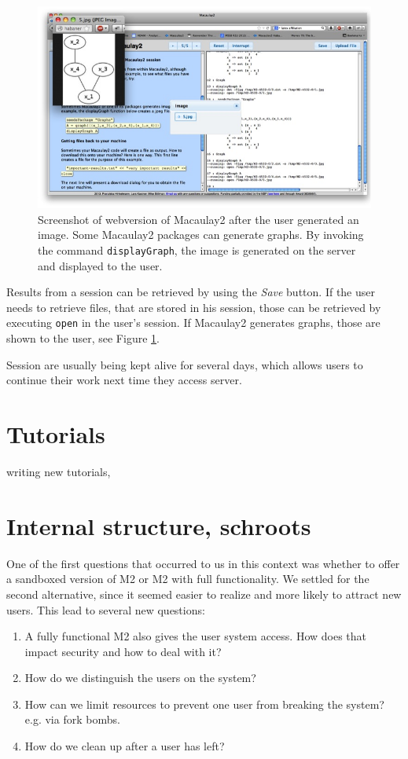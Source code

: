 \documentclass[]{article}
\begin{document}
\begin{figure}[htb]
    \includegraphics[width=.95\textwidth]{withGraph.jpg}
    \caption{Screenshot of webversion of Macaulay2 after the user generated an image. Some Macaulay2 packages can generate graphs. By invoking the command {\tt displayGraph}, the image is generated on the server and displayed to the user.}
    \label{fig:graph}
\end{figure}

Results from a session can be retrieved by using the {\it Save} button. If the user needs to retrieve files, that are stored in his session, those can be retrieved by executing {\tt open} in the user's session. If Macaulay2 generates graphs, those are shown to the user, see Figure \ref{fig:graph}.

Session are usually being kept alive for several days, which allows users to continue their work next time they access server. 

\section{Tutorials}
writing new tutorials,
\section{Internal structure, schroots}
One of the first questions that occurred to us in this context was whether to offer a sandboxed version of M2 or M2 with full functionality.
We settled for the second alternative, since it seemed easier to realize and more likely to attract new users.
This lead to several new questions:
\begin{enumerate}
\item A fully functional M2 also gives the user system access. How does that impact security and how to deal with it?
\item How do we distinguish the users on the system?
\item How can we limit resources to prevent one user from breaking the system? e.g. via fork bombs.
\item How do we clean up after a user has left?
\end{enumerate}
\end{document}

